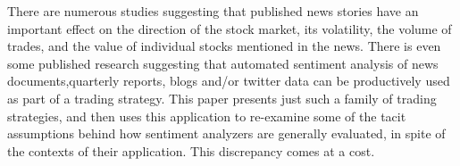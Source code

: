 There are numerous studies suggesting that published news stories have an important effect on the direction of the stock market, its volatility, the volume of trades, and the value of individual stocks mentioned in the news. There is even some published research suggesting that automated sentiment analysis of news documents,quarterly reports, blogs and/or twitter data can be productively used as part of a trading strategy.  This paper presents just such a family of trading strategies, and then uses this application to re-examine some of the tacit assumptions behind how sentiment analyzers are generally evaluated, in spite of the contexts of their application. This discrepancy comes at a cost.
